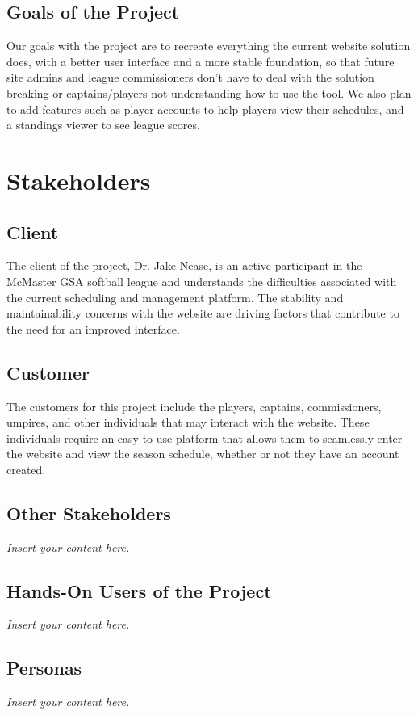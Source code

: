 \documentclass[12pt]{article}
\newcommand{\lips}{\textit{Insert your content here.}}
\begin{document}
\subsection{Goals of the Project}
Our goals with the project are to recreate everything the current website
solution does, with a better user interface and a more stable foundation, so
that future site admins and league commissioners don't have to deal with the
solution breaking or captains/players not understanding how to use the tool.
We also plan to add features such as player accounts to help players view
their schedules, and a standings viewer to see league scores.

\section{Stakeholders}
\subsection{Client}

The client of the project, Dr. Jake Nease, is an active participant in the
McMaster GSA softball league and understands the difficulties associated with
the current scheduling and management platform. The stability and maintainability
concerns with the website are driving factors that contribute to the need for
an improved interface.

\subsection{Customer}

The customers for this project include the players, captains, commissioners,
umpires, and other individuals that may interact with the website. These
individuals require an easy-to-use platform that allows them to seamlessly
enter the website and view the season schedule, whether or not they have an
account created.

\subsection{Other Stakeholders}
\lips
\subsection{Hands-On Users of the Project}
\lips
\subsection{Personas}
\lips
\end{document}
